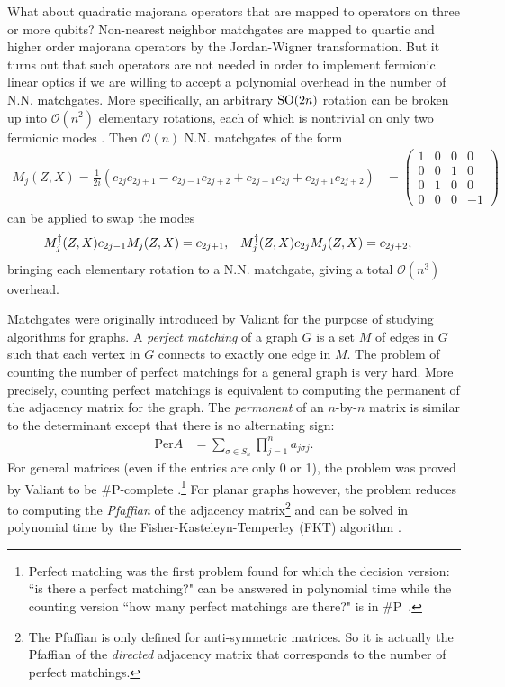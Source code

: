 What about quadratic majorana operators that are mapped to operators on three or more qubits? Non-nearest neighbor matchgates are mapped to quartic and higher order majorana operators by the Jordan-Wigner transformation. But it turns out that such operators are not needed in order to implement fermionic linear optics if we are willing to accept a polynomial overhead in the number of N.N. matchgates. More specifically, an arbitrary $\text{SO}(2n)$ rotation can be broken up into $\mathcal{O}(n^2)$ elementary rotations, each of which is nontrivial on only two fermionic modes \cite{hoffman_generalization_1972}. Then $\mathcal{O}(n)$ N.N. matchgates of the form
\begin{align}\label{def:modal-swap}
	M_j(Z,X) = \frac{1}{2i}(c_{2j}c_{2j+1} - c_{2j-1}c_{2j+2} + c_{2j-1}c_{2j} + c_{2j+1}c_{2j+2})
	&= \begin{pmatrix}
		1 & 0 & 0 & 0 \\
		0 & 0 & 1 & 0 \\
		0 & 1 & 0 & 0 \\
		0 & 0 & 0 & -1
	\end{pmatrix}
\end{align}
can be applied to swap the modes
\begin{align}
	M^{\dagger}_j(Z,X) c_{2j-1} M_j(Z,X) &= c_{2j+1}, & M^{\dagger}_j(Z,X) c_{2j} M_j(Z,X) &= c_{2j+2},
\end{align}
bringing each elementary rotation to a N.N. matchgate, giving a total $\mathcal{O}(n^3)$ overhead.

Matchgates were originally introduced by Valiant \cite{valiant_quantum_2002,valiant_holographic_2008} for the purpose of studying algorithms for graphs. A \emph{perfect matching} of a graph $G$ is a set $M$ of edges in $G$ such that each vertex in $G$ connects to exactly one edge in $M$. The problem of counting the number of perfect matchings for a general graph is very hard. More precisely, counting perfect matchings is equivalent to computing the permanent of the adjacency matrix for the graph. The \emph{permanent} of an $n$-by-$n$ matrix is similar to the determinant except that there is no alternating sign:
\begin{align}
	\text{Per} A &= \sum_{\sigma \in S_n} \prod_{j=1}^n a_{j\sigma{j}}.
\end{align}
For general matrices (even if the entries are only 0 or 1), the problem was proved by Valiant to be \#P-complete \cite{valiant_complexity_1979}.\footnote{Perfect matching was the first problem found for which the decision version: ``is there a perfect matching?" can be answered in polynomial time while the counting version ``how many perfect matchings are there?" is in \#P~\cite{AB}.} For planar graphs however, the problem reduces to computing the \emph{Pfaffian} of the adjacency matrix\footnote{The Pfaffian is only defined for anti-symmetric matrices. So it is actually the Pfaffian of the \emph{directed} adjacency matrix that corresponds to the number of perfect matchings.} and can be solved in polynomial time by the Fisher-Kasteleyn-Temperley (FKT) algorithm \cite{kasteleyn_statistics_1961,temperley_dimer_1961,kasteleyn_dimer_1963}.  

